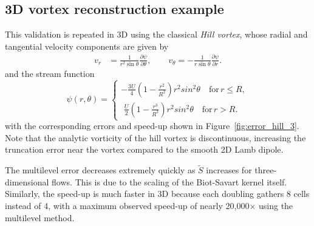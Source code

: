 \documentclass[final,1p,times]{elsarticle}
\begin{document}

\subsection{3D vortex reconstruction example}

This validation is repeated in 3D using the classical \emph{Hill vortex}, whose radial and tangential velocity components are given by
\begin{align}
    v_r &= \frac{1}{r^2\sin\theta}\frac{\partial\psi}{\partial\theta}, \qquad v_\theta = -\frac{1}{r\sin\theta}\frac{\partial\psi}{\partial r}.
\end{align}
and the stream function 
\begin{equation}
    \psi(r,\theta) = \begin{cases}
    -\frac{3U}{4}\left(1-\frac{r^2}{R^2}\right)r^2sin^2\theta \quad \text{for} \, r \le R,\\
     \,\,\frac{U}{2}\left(1-\frac{r^3}{R^3}\right)r^2sin^2\theta \quad \text{for} \, r > R.
    \end{cases}
\end{equation}
with the corresponding errors and speed-up shown in Figure~\ref{fig:error_hill_3}. Note that the analytic vorticity of the hill vortex is discontinuous, increasing the truncation error near the vortex compared to the smooth 2D Lamb dipole.

The multilevel error decreases extremely quickly as $\tilde S$ increases for three-dimensional flows. This is due to the scaling of the Biot-Savart kernel itself. Similarly, the speed-up is much faster in 3D because each doubling gathers 8 cells instead of 4, with a maximum observed speed-up of nearly 20,000$\times$ using the multilevel method.
\end{document}

